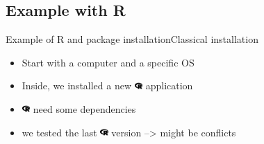 \subsection{Example with R}
\begin{frame}{Example of R and package installation}{Classical installation}
\begin{itemize}[<+->]
	\item Start with a computer and a specific OS
	\item Inside, we installed a new \includegraphics[width=0.3cm, height=0.3cm]{images/r-project.pdf} application
	\item \includegraphics[width=0.3cm, height=0.3cm]{images/r-project.pdf} need some dependencies
	\item we tested the last  \includegraphics[width=0.3cm, height=0.3cm]{images/r-project.pdf} version --> might be conflicts
\end{itemize}

\end{frame}

